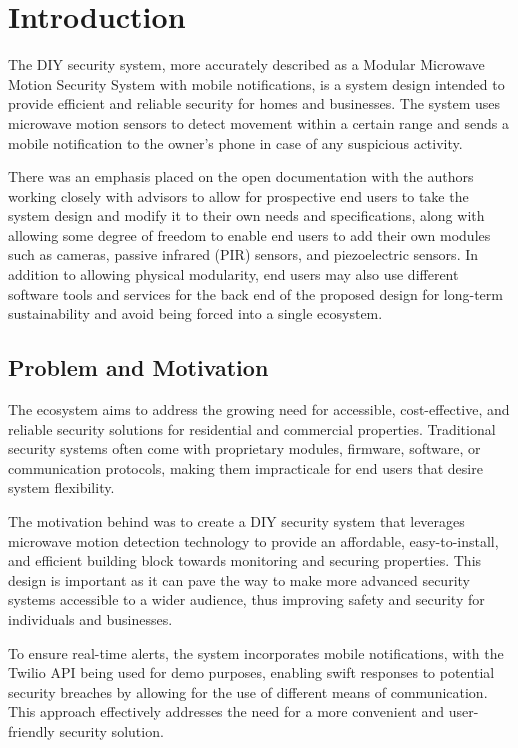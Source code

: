 \section{Introduction}\label{sec:intro}

The \brand{} DIY security system, more accurately described as a Modular Microwave Motion
Security System with mobile notifications, is a system design intended to provide efficient
and reliable security for homes and businesses. The system uses microwave motion
sensors to detect movement within a certain range and sends a mobile notification to
the owner's phone in case of any suspicious activity.

There was an emphasis placed on the open documentation with the authors working
closely with advisors to allow for prospective end users to take the system design
and modify it to their own needs and specifications, along with allowing some degree of
freedom to enable end users to add their own modules such as cameras, passive infrared
(PIR) sensors, and piezoelectric sensors. In addition to allowing physical modularity, end users
may also use different software tools and services for the back end of the proposed design for
long-term sustainability and avoid being forced into a single ecosystem.

\subsection{Problem and Motivation}\label{subsec:problem-and-motivation}

The \brand{} ecosystem aims to address the growing need for accessible, cost-effective,
and reliable security solutions for residential and commercial properties.
Traditional security systems often come with proprietary modules, firmware, software,
or communication protocols, making them impracticale for end users that desire system
flexibility.

The motivation behind \brand{} was to create a DIY security system that leverages
microwave motion detection technology to provide an affordable, easy-to-install, and
efficient building block towards monitoring and securing properties. This design is important as
it can pave the way to make more advanced security systems accessible to a wider
audience, thus improving safety and security for individuals and businesses.

To ensure real-time alerts, the system incorporates mobile notifications, with the Twilio API
being used for demo purposes, enabling swift responses to potential security breaches by
allowing for the use of different means of communication. This approach effectively addresses
the need for a more convenient and user-friendly security solution.

